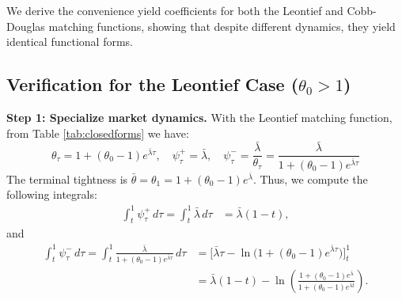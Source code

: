 We derive the convenience yield coefficients for both the Leontief and Cobb-Douglas matching functions, showing that despite different dynamics, they yield identical functional forms.

\subsection{Verification for the Leontief Case ($\theta_0 > 1$)}

\textbf{Step 1: Specialize market dynamics.}
With the Leontief matching function, from Table \ref{tab:closedforms} we have:
\[
\theta_{\tau} = 1 + (\theta_0 - 1)e^{\bar{\lambda}\tau},\quad \psi^+_{\tau} = \bar{\lambda}, \quad \psi^-_{\tau}= \frac{\bar{\lambda}}{\theta_{\tau}} = \frac{\bar{\lambda}}{1 + (\theta_0 - 1)e^{\bar{\lambda}\tau}}
\]
The terminal tightness is $\bar{\theta} = \theta_1 = 1 + (\theta_0 - 1)e^{\bar{\lambda}}$. Thus, we compute the following integrals:
\begin{align*}
\int_t^1 \psi_\tau^+ \, d\tau = \int_t^1 \bar{\lambda} \, d\tau &= \bar{\lambda}(1-t),
\end{align*}
and
\begin{align*}
 \int_t^1 \psi_\tau^- \, d\tau = \int_t^1 \frac{\bar{\lambda}}{1 + (\theta_0 - 1)e^{\bar{\lambda}\tau}} \, d\tau
&= \Big[\bar{\lambda}\tau - \ln\big(1 + (\theta_0 - 1)e^{\bar{\lambda}\tau}\big)\Big]_t^1\\
&= \bar{\lambda}(1-t) - \ln\left(\frac{1 + (\theta_0 - 1)e^{\bar{\lambda}}}{1 + (\theta_0 - 1)e^{\bar{\lambda}t}}\right).
\end{align*}

